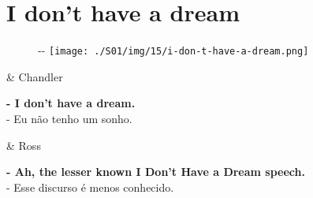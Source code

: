 \hypertarget{i-dont-have-a-dream}{%
\section{I don't have a dream}\label{i-dont-have-a-dream}}

\begin{figure}[!ht]
  \begin{adjustwidth}{-\oddsidemargin-1in}{-\rightmargin}
    \centering
    \texttt{[image: ./S01/img/15/i-don-t-have-a-dream.png]}
  \end{adjustwidth}
\end{figure}

\begin{tcolorbox}[enhanced,center upper,
    drop fuzzy shadow southeast, boxrule=0.3pt,
    lower separated=false, breakable,
    colframe=black!30!dialogoBorder,colback=white]
\begin{minipage}[c]{0.16\linewidth}
   & \centering \scriptsize{Chandler}
\end{minipage}
\hfill
\begin{minipage}[c]{0.8\linewidth}
  \textbf{- I don't have a dream.}\\
  - Eu não tenho um sonho.
\end{minipage}

\medskip
\begin{minipage}[c]{0.16\linewidth}
   & \centering \scriptsize{Ross}
\end{minipage}
\hfill
\begin{minipage}[c]{0.8\linewidth}
  \textbf{- Ah, the lesser known I Don't Have a Dream speech.}\\
  - Esse discurso é menos conhecido.
\end{minipage}
\end{tcolorbox}

